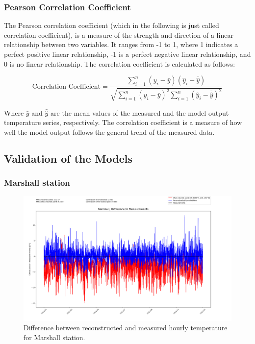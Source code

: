 \subsubsection*{Pearson Correlation Coefficient}

The Pearson correlation coefficient (which in the following is just called correlation coefficient), is a measure of the strength and direction of a linear relationship between two variables.
It ranges from -1 to 1, where 1 indicates a perfect positive linear relationship, -1 is a perfect negative linear relationship, and 0 is no linear relationship. The correlation coefficient is calculated as follows:

\begin{equation}
    \text{Correlation Coefficient} = \frac{\sum_{i=1}^{n} (y_i - \bar{y})(\hat{y}_i - \bar{\hat{y}})}{\sqrt{\sum_{i=1}^{n} (y_i - \bar{y})^2 \sum_{i=1}^{n} (\hat{y}_i - \bar{\hat{y}})^2}}
    \label{eq: correlation}
\end{equation}
    
Where $\bar{y}$ and $\bar{\hat{y}}$ are the mean values of the measured and the model output temperature series, respectively.
The correlation coefficient is a measure of how well the model output follows the general trend of the measured data. \cite{Zou2003Correlation}

\subsection{Validation of the Models}
\label{subsec: validation_results}

\subsubsection*{Marshall station}

\begin{figure}
    \centering
    \includegraphics[width=1.00\textwidth]{resources/images/charts/marshall_eval_grib_final/Marshall, Difference to Measurements.png}
    \caption{Difference between reconstructed and measured hourly temperature for Marshall station.}
    \label{fig: marshall_diff}
\end{figure}

